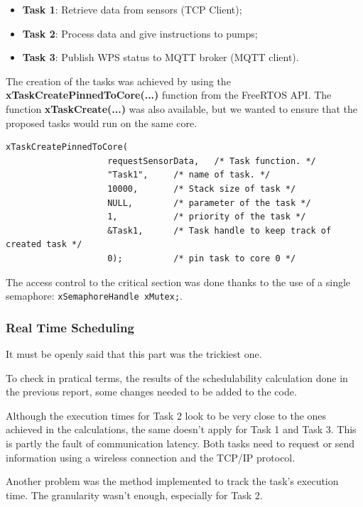 \documentclass[11pt]{article}
\begin{document}
\begin{itemize}
	\item  \textbf{Task 1}: Retrieve data from sensors (TCP Client);
	\item  \textbf{Task 2}: Process data and give instructions to pumps;
	\item  \textbf{Task 3}: Publish WPS status to MQTT broker (MQTT client).
\end{itemize}

\noindent
The creation of the tasks was achieved by using the \textbf{xTaskCreatePinnedToCore(...)} \cite{c1} function from the FreeRTOS API. The function \textbf{xTaskCreate(...)} was also available, but we wanted to ensure that the proposed tasks would run on the same core.

\begin{verbatim}
xTaskCreatePinnedToCore(
                    requestSensorData,   /* Task function. */
                    "Task1",     /* name of task. */
                    10000,       /* Stack size of task */
                    NULL,        /* parameter of the task */
                    1,           /* priority of the task */
                    &Task1,      /* Task handle to keep track of created task */
                    0);          /* pin task to core 0 */  
\end{verbatim}

The access control to the critical section was done thanks to the use of a single semaphore: \texttt{xSemaphoreHandle xMutex;}.

\subsubsection{Real Time Scheduling}

It must be openly said that this part was the trickiest one.

To check in pratical terms, the results of the schedulability calculation done in the previous report, some changes needed to be added to the code.

Although the execution times for Task 2 look to be very close to the ones achieved in the calculations, the same doesn't apply for Task 1 and Task 3. This is partly the fault of communication latency. Both tasks need to request or send information using a wireless connection and the TCP/IP protocol.

Another problem was the method implemented to track the task's execution time. The granularity wasn't enough, especially for Task 2.
\end{document}
